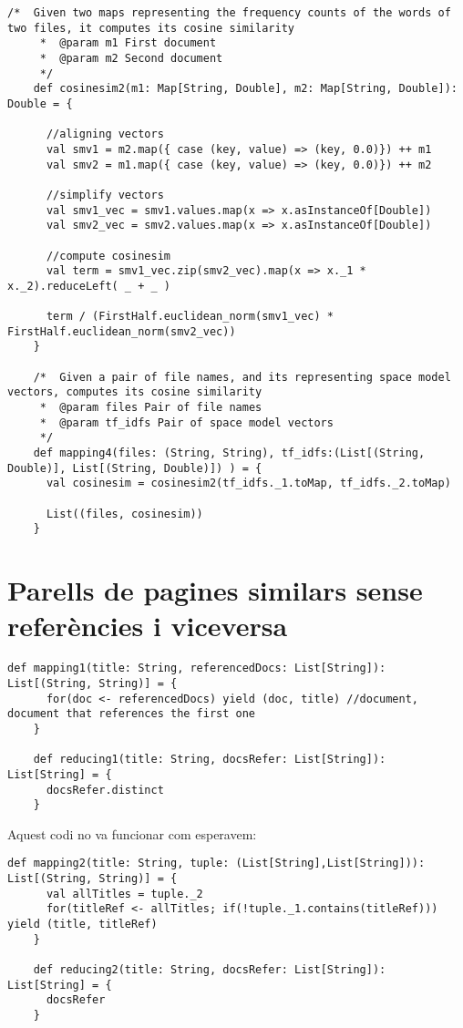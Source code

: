 \documentclass{report}
\begin{document}
\begin{lstlisting}[style=scalaHighlight]
/*  Given two maps representing the frequency counts of the words of two files, it computes its cosine similarity
     *  @param m1 First document
     *  @param m2 Second document
     */
    def cosinesim2(m1: Map[String, Double], m2: Map[String, Double]): Double = {

      //aligning vectors
      val smv1 = m2.map({ case (key, value) => (key, 0.0)}) ++ m1
      val smv2 = m1.map({ case (key, value) => (key, 0.0)}) ++ m2

      //simplify vectors
      val smv1_vec = smv1.values.map(x => x.asInstanceOf[Double])
      val smv2_vec = smv2.values.map(x => x.asInstanceOf[Double])

      //compute cosinesim
      val term = smv1_vec.zip(smv2_vec).map(x => x._1 * x._2).reduceLeft( _ + _ )

      term / (FirstHalf.euclidean_norm(smv1_vec) * FirstHalf.euclidean_norm(smv2_vec))
    }

    /*  Given a pair of file names, and its representing space model vectors, computes its cosine similarity
     *  @param files Pair of file names
     *  @param tf_idfs Pair of space model vectors
     */
    def mapping4(files: (String, String), tf_idfs:(List[(String, Double)], List[(String, Double)]) ) = {
      val cosinesim = cosinesim2(tf_idfs._1.toMap, tf_idfs._2.toMap)

      List((files, cosinesim))
    }
\end{lstlisting}

\newpage

\section{Parells de pagines similars sense referències i viceversa}

\begin{lstlisting}[style=scalaHighlight]
    def mapping1(title: String, referencedDocs: List[String]): List[(String, String)] = {
      for(doc <- referencedDocs) yield (doc, title) //document, document that references the first one
    }

    def reducing1(title: String, docsRefer: List[String]): List[String] = {
      docsRefer.distinct
    }
\end{lstlisting}

Aquest codi no va funcionar com esperavem:
\begin{lstlisting}[style=scalaHighlight]
    def mapping2(title: String, tuple: (List[String],List[String])): List[(String, String)] = {
      val allTitles = tuple._2
      for(titleRef <- allTitles; if(!tuple._1.contains(titleRef))) yield (title, titleRef)
    }

    def reducing2(title: String, docsRefer: List[String]): List[String] = {
      docsRefer
    }
\end{lstlisting}
\end{document}
